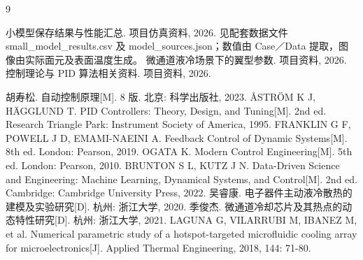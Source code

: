 \documentclass[stage2,fontset=fandol]{ydzjreport}
\begin{document}
\FloatBarrier
{}
\begin{thebibliography}{9}

 小模型保存结果与性能汇总. 项目仿真资料, 2026. 见配套数据文件 small\_model\_results.csv 及 model\_sources.json；数值由 Case／Data 提取，图像由实际面元及表面温度生成。
 微通道液冷场景下的翼型参数. 项目资料, 2026.
 控制理论与 PID 算法相关资料. 项目资料, 2026.

 胡寿松. 自动控制原理[M]. 8 版. 北京: 科学出版社, 2023.
 {\AA}STR{\"O}M K J, H{\"A}GGLUND T. PID Controllers: Theory, Design, and Tuning[M]. 2nd ed. Research Triangle Park: Instrument Society of America, 1995.
 FRANKLIN G F, POWELL J D, EMAMI-NAEINI A. Feedback Control of Dynamic Systems[M]. 8th ed. London: Pearson, 2019.
 OGATA K. Modern Control Engineering[M]. 5th ed. London: Pearson, 2010.
 BRUNTON S L, KUTZ J N. Data-Driven Science and Engineering: Machine Learning, Dynamical Systems, and Control[M]. 2nd ed. Cambridge: Cambridge University Press, 2022.
 吴睿康. 电子器件主动液冷散热的建模及实验研究[D]. 杭州: 浙江大学, 2020.
 季俊杰. 微通道冷却芯片及其热点的动态特性研究[D]. 杭州: 浙江大学, 2021.
 LAGUNA G, VILARRUBI M, IBANEZ M, et al. Numerical parametric study of a hotspot-targeted microfluidic cooling array for microelectronics[J]. Applied Thermal Engineering, 2018, 144: 71-80.
\end{thebibliography}
\end{document}
